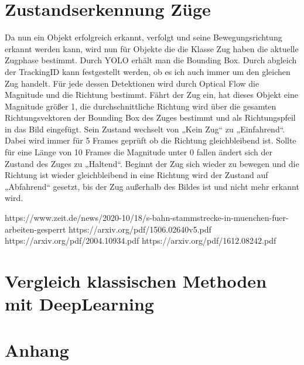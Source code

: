 \documentclass[conference]{IEEEtran}
\begin{document}
	\section{Zustandserkennung Züge}
	Da nun ein Objekt erfolgreich erkannt, verfolgt und seine Bewegungsrichtung erkannt werden kann, wird nun für Objekte die die Klasse Zug haben die aktuelle Zugphase bestimmt. 
	Durch YOLO erhält man die Bounding Box. Durch abgleich der TrackingID kann festgestellt werden, ob es ich auch immer um den gleichen Zug handelt. Für jede dessen Detektionen wird durch Optical Flow die Magnitude und die Richtung bestimmt. Fährt der Zug ein, hat dieses Objekt eine Magnitude größer 1, die durchschnittliche Richtung wird über die gesamten Richtungsvektoren der Bounding Box des Zuges bestimmt und als Richtungspfeil in das Bild eingefügt. Sein Zustand wechselt von „Kein Zug“ zu „Einfahrend“. Dabei wird immer für 5 Frames geprüft ob die Richtung gleichbleibend ist. Sollte für eine Länge von 10 Frames die Magnitude unter 0 fallen ändert sich der Zustand des Zuges zu „Haltend“. Beginnt der Zug sich wieder zu bewegen und die Richtung ist wieder gleichbleibend in eine Richtung wird der Zustand auf „Abfahrend“ gesetzt, bis der Zug außerhalb des Bildes ist und nicht mehr erkannt wird.
	
	\begin{thebibliography}{00}
		https://www.zeit.de/news/2020-10/18/s-bahn-stammstrecke-in-muenchen-fuer-arbeiten-gesperrt
		https://arxiv.org/pdf/1506.02640v5.pdf
		https://arxiv.org/pdf/2004.10934.pdf
		https://arxiv.org/pdf/1612.08242.pdf
	\end{thebibliography}
	
	\section{Vergleich klassischen Methoden mit DeepLearning}
	
	\section{Anhang}
	
\end{document}
